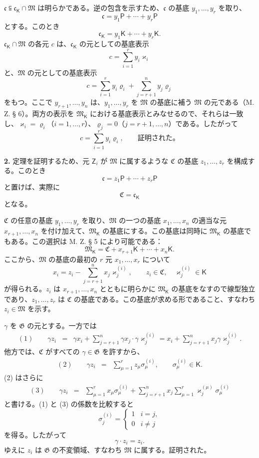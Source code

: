 $\mathfrak c\subseteqq\mathfrak c_{\mathsf K}\cap\mathfrak M$ は明らかである。逆の包含を示すため、$\mathfrak c$ の基底 $y_1,\ldots,y_r$ を取り、
\[
\mathfrak c=y_1\mathsf P+\cdots+y_r\mathsf P
\]
とする。このとき
\[
\mathfrak c_{\mathsf K}=y_1\mathsf K+\cdots+y_r\mathsf K.
\]
$\mathfrak c_{\mathsf K}\cap\mathfrak M$ の各元 $c$ は、$\mathfrak c_{\mathsf K}$ の元としての基底表示
\[
c=\sum_{i=1}^{r}y_i\varkappa_i
\]
と、$\mathfrak M$ の元としての基底表示
\[
c=\sum_{i=1}^{r}y_i\varrho_i+\sum_{j=r+1}^{n}y_j\varrho_j
\]
をもつ。ここで $y_{r+1},\ldots,y_n$ は、$y_1,\ldots,y_r$ を $\mathfrak M$ の基底に補う $\mathfrak M$ の元である（M. Z. § 6）。両方の表示を $\mathfrak M_{\mathsf K}$ における基底表示とみなせるので、それらは一致し、$\varkappa_i=\varrho_i$（$i=1,\ldots,r$）、$\varrho_j=0$（$j=r+1,\ldots,n$）である。したがって
\[
c=\sum_{i=1}^{r}y_i\varrho_i,
\qquad\text{証明された。}
\]

\textbf{2.} 定理を証明するため、元 $\mathsf{Z}_i$ が $\mathfrak M$ に属するような $\mathfrak C$ の基底 $z_1,\ldots,z_r$ を構成する。このとき
\[
\mathfrak c=z_1\mathsf P+\cdots+z_r\mathsf P
\]
と置けば、実際に
\[
\mathfrak C=\mathfrak c_{\mathsf K}
\]
となる。

$\mathfrak C$ の任意の基底 $y_1,\ldots,y_r$ を取り、$\mathfrak M$ の一つの基底 $x_1,\ldots,x_n$ の適当な元 $x_{r+1},\ldots,x_n$ を付け加えて、$\mathfrak M_{\mathsf K}$ の基底にする。この基底は同時に $\mathfrak M_{\mathsf K}$ の基底でもある。この選択は M. Z. § 5 により可能である：
\[
\mathfrak M_{\mathsf K}=\mathfrak C+x_{r+1}\mathsf K+\cdots+x_n\mathsf K.
\]
ここから、$\mathfrak M$ の基底の最初の $r$ 元 $x_1,\ldots,x_r$ について
\[
x_i=z_i-\sum_{j=r+1}^{n}x_j\varkappa_j^{(i)},\qquad
z_i\in\mathfrak C,\quad \varkappa_j^{(i)}\in\mathsf K
\]
が得られる。$z_i$ は $x_{r+1},\ldots,x_n$ とともに明らかに $\mathfrak M_{\mathsf K}$ の基底をなすので線型独立であり、$z_1,\ldots,z_r$ は $\mathfrak C$ の基底である。この基底が求める形であること、すなわち $z_i\in\mathfrak M$ を示す。

$\gamma$ を $\mathfrak G$ の元とする。一方では
\[
\begin{array}{rcl}
(1)\qquad \gamma z_i
&=&\gamma x_i+\displaystyle\sum_{j=r+1}^{n}\gamma x_j\cdot \gamma\varkappa_j^{(i)}
=x_i+\displaystyle\sum_{j=r+1}^{n}x_j\gamma\varkappa_j^{(i)}.
\end{array}
\]
他方では、$\mathfrak C$ がすべての $\gamma\in\mathfrak G$ を許すから、
\[
\begin{array}{rcl}
(2)\qquad \gamma z_i&=&\displaystyle\sum_{\mu=1}^{r}z_\mu\sigma_\mu^{(i)},
\qquad \sigma_\mu^{(i)}\in\mathsf K.
\end{array}
\]
(2) はさらに
\[
\begin{array}{rcl}
(3)\qquad \gamma z_i
&=&\displaystyle\sum_{\mu=1}^{r}x_\mu\sigma_\mu^{(i)}
+\displaystyle\sum_{j=r+1}^{n}x_j\sum_{\mu=1}^{r}\varkappa_j^{(\mu)}\sigma_\mu^{(i)}
\end{array}
\]
と書ける。(1) と (3) の係数を比較すると
\[
\sigma_j^{(i)}=
\begin{cases}
1 & i=j,\\
0 & i\ne j
\end{cases}
\]
を得る。したがって
\[
\gamma\cdot z_i=z_i.
\]
ゆえに $z_i$ は $\mathfrak G$ の不変領域、すなわち $\mathfrak M$ に属する。証明された。

